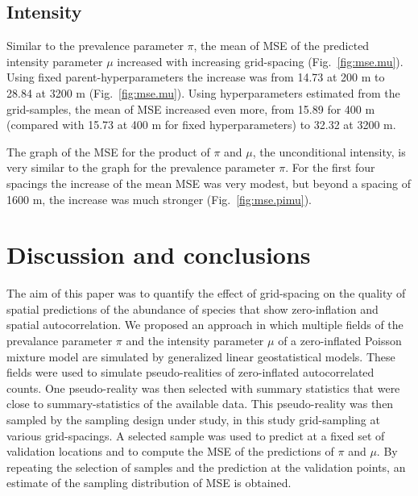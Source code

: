 \documentclass[review]{elsarticle}
\begin{document}
\subsection{Intensity}
Similar to the prevalence parameter $\pi$, the  mean of MSE of the predicted intensity parameter $\mu$ increased with increasing grid-spacing (Fig.~\ref{fig:mse.mu}). Using fixed parent-hyperparameters the increase was from 14.73 at 200 m to 28.84 at 3200 m (Fig.~\ref{fig:mse.mu}). Using hyperparameters estimated from the grid-samples, the mean of MSE increased even more, from 15.89 for 400 m (compared with 15.73 at 400 m for fixed hyperparameters) to 32.32 at 3200 m.  

The  graph of the MSE for the product of $\pi$ and $\mu$, the unconditional intensity, is very similar to the graph for the prevalence parameter $\pi$. For the first four spacings the increase of the mean MSE was very modest, but beyond a spacing of 1600 m, the increase was much stronger (Fig.~\ref{fig:mse.pimu}).  

\section{Discussion and conclusions}\label{sec:discussion}

The aim of this paper was to quantify the effect of grid-spacing on the quality of spatial predictions of the abundance of species that show zero-inflation and spatial autocorrelation. We proposed an approach in which multiple fields of the prevalance parameter $\pi$ and the intensity parameter $\mu$ of a zero-inflated Poisson mixture model are simulated by generalized linear geostatistical models. These fields were used to simulate pseudo-realities of zero-inflated autocorrelated counts. One pseudo-reality was then selected with summary statistics that were close to summary-statistics of the available data. This pseudo-reality was then sampled by the sampling design under study, in this study grid-sampling at various grid-spacings. A selected sample was used to predict at a fixed set of validation locations and to compute the MSE of the predictions of $\pi$ and $\mu$. By repeating the selection of samples and the prediction at the validation points, an estimate of the sampling distribution of MSE is obtained.
\end{document}
